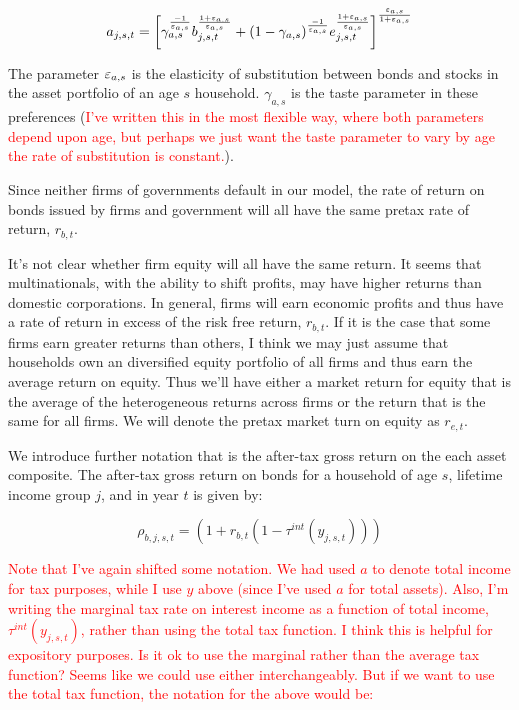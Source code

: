 \begin{equation}
\label{eqn:ces_port}
a_{j,s,t}= \left[\gamma_{a,s}^{\frac{-1}{\varepsilon_{a,s}}}b_{j,s,t}^{\frac{1+\varepsilon_{a.s}}{\varepsilon_{a,s}}}+(1-\gamma_{a,s})^{\frac{-1}{\varepsilon_{a,s}}}e_{j,s,t}^{\frac{1+\varepsilon_{a,s}}{\varepsilon_{a,s}}}\right]^{\frac{\varepsilon_{a,s}}{1+\varepsilon_{a,s}}}
\end{equation}
    
The parameter $\varepsilon_{a,s}$ is the elasticity of substitution between bonds and stocks in the asset portfolio of an age $s$ household.  $\gamma_{a,s}$ is the taste parameter in these preferences (\textcolor{red}{I've written this in the most flexible way, where both parameters depend upon age, but perhaps we just want the taste parameter to vary by age the rate of substitution is constant.}).

Since neither firms of governments default in our model, the rate of return on bonds issued by firms and government will all have the same pretax rate of return, $r_{b,t}$.  

It's not clear whether firm equity will all have the same return.  It seems that multinationals, with the ability to shift profits, may have higher returns than domestic corporations.  In general, firms will earn economic profits and thus have a rate of return in excess of the risk free return, $r_{b,t}$.  If it is the case that some firms earn greater returns than others, I think we may just assume that households own an diversified equity portfolio of all firms and thus earn the average return on equity.  Thus we'll have either a market return for equity that is the average of the heterogeneous returns across firms or the return that is the same for all firms.  We will denote the pretax market turn on equity as $r_{e,t}$.

We introduce further notation that is the after-tax gross return on the each asset composite.  The after-tax gross return on bonds for a household of age $s$, lifetime income group $j$, and in year $t$ is given by:

\begin{equation}
\rho_{b,j,s,t}=(1+r_{b,t}(1-\tau^{int}(y_{j,s,t})))
\end{equation}

\textcolor{red}{Note that I've again shifted some notation.  We had used $a$ to denote total income for tax purposes, while I use $y$ above (since I've used $a$ for total assets).  Also, I'm writing the marginal tax rate on interest income as a function of total income, $\tau^{int}(y_{j,s,t})$, rather than using the total tax function.  I think this is helpful for expository purposes.  Is it ok to use the marginal rather than the average tax function?  Seems like we could use either interchangeably.  But if we want to use the total tax function, the notation for the above would be: } 

